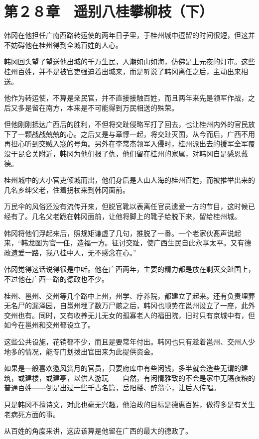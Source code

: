 \section{第２８章　遥别八桂攀柳枝（下）}

韩冈在他担任广南西路转运使的两年日子里，于桂州城中逗留的时间很短，但这并不妨碍他在桂州得到全城百姓的人心。

韩冈回头望了望送他出城的千万生民，人潮如山如海，仿佛是上元夜的灯市。这些桂州百姓，并不是被官吏强迫着出城来，而是听说了韩冈离任之后，主动出来相送。

他作为转运使，不算是亲民官，并不直接接触百姓，而且两年来先是领军作战，之后又多是留在南方，本来是不可能得到万民相送的殊荣。

但他刚刚抵达广西后的胜利，不但将交趾侵略军打了回去，也让桂州内外的官民放下了一颗战战兢兢的心。之后又是与章惇一起，将交趾灭国，从今而后，广西不用再担心听到交贼入寇的号角。另外在李常杰领军入侵时，桂州派出去的援军全军覆没于昆仑关附近，韩冈为他们报了仇，他们留在桂州的家属，对韩冈自是感恩戴德。

桂州城中的大小官吏倾城而出，他们身后是人山人海的桂州百姓，而被推举出来的几名乡绅父老，住着拐杖来到韩冈面前。

万民伞的风俗还没有流传开来，但脱官靴以表离任官员遗爱一方的节目，这时候已经有了。几名父老跪在韩冈面前，让他将脚上的靴子给脱下来，留给桂州城。

韩冈将他们浮起来后，照规矩谦虚了几句，推脱了一番。一个老家伙髙声说起来，“韩龙图为官一任，造福一方。征讨交趾，使广西生民自此永享太平。又有德政遗爱一路，我八桂中人，无不感念在心。”

韩冈觉得这话说得很是中听。他在广西两年，主要的精力都是放在剿灭交趾国上，不过他在广西一路的德政也不少。

桂州、邕州、交州等几个路中上州，州学、疗养院，都建立了起来。还有负责埋葬无名尸的漏泽园，自邕州埋了数万尸骸之后，韩冈也顺势在邕州设立了一座，此外交州也有。同时，又有收养无儿无女的孤寡老人的福田院，旧时只有京城中有，但如今在邕州和交州都设立了。

这些公共设施，花销都不少，而且是要常年付出。韩冈也只有趁着邕州、交州人少地多的情况，能专门划拨出官田来为此提供资金。

如果是一般喜欢邀风赏月的官员，只要府库中有些闲钱，多半就会造些无谓的建筑，或建楼，或建亭，以供人游玩——自然，有闲情雅致的不会是家中无隔夜粮的普通百姓——倒是出过一些千古名篇，岳阳楼、醉翁亭，让后人传唱。

只是韩冈不擅诗文，对此也毫无兴趣，他治政的目标是德惠百姓，做得多是有关生老病死方面的事。

从百姓的角度来讲，这应该算是他留在广西的最大的德政了。

